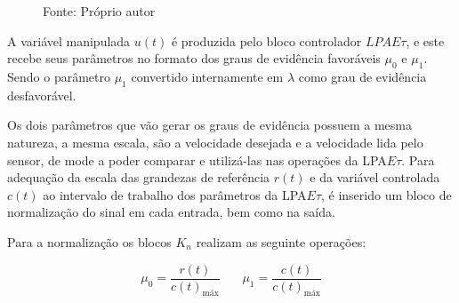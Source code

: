 \begin{figure}[!h]
\label{fig:diagramaBlocosLPAEt}

{\vspace{0.2cm} \small Fonte: Próprio autor}
\end{figure}



A variável manipulada $u(t)$ é produzida pelo 
bloco controlador $LPAE\tau$, 
e este recebe seus parâmetros no formato dos 
graus de evidência favoráveis $\mu_0$ e $\mu_1$.
Sendo o parâmetro $\mu_1$ 
convertido internamente em $\lambda$ 
como grau de evidência desfavorável.

Os dois parâmetros que vão gerar os graus de evidência 
possuem a mesma natureza, a mesma escala, 
são a velocidade desejada e a velocidade lida pelo sensor,
de mode a poder comparar e utilizá-las nas operações da
LPA$E\tau$. 
Para adequação da escala das grandezas 
de referência $r(t)$ e da variável controlada $c(t)$
ao intervalo de trabalho dos parâmetros da LPA$E\tau$, 
é inserido um bloco de normalização do sinal em cada entrada,
bem como na saída.


Para a normalização os blocos $K_n$ realizam as seguinte operações:

\begin{equation}%
\mu_0 = \frac{ r(t)}{c(t)_{\text{máx}}} \ \ \ \ \ \ \ \ \mu_1 = \frac{c(t)}{c(t)_{\text{máx}}}
\end{equation}%

